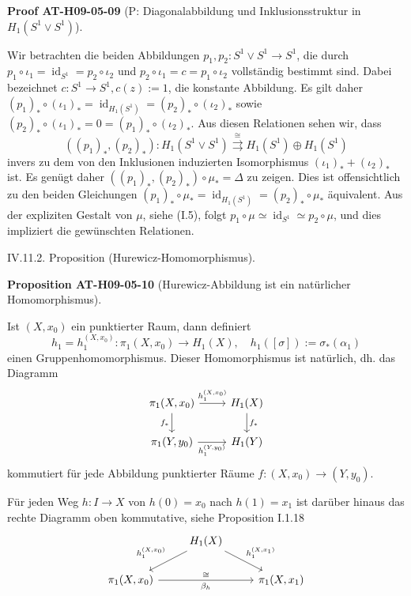 \documentclass[10pt, letterpaper]{article}
\newcommand{\CustomHeading}[3]{%
  \par\medskip\noindent%
  \textbf{#1 #2} \textnormal{(#3)}.\enskip%
}
\newenvironment{PROP}[2]{\begin{unitbox}\CustomHeading{Proposition}{#1}{#2}}{\end{unitbox}}
\newenvironment{PROOF}[2]{\begin{unitbox}\CustomHeading{Proof}{#1}{#2}}{\end{unitbox}}
\begin{document}
\begin{PROOF}{AT-H09-05-09}{P: Diagonalabbildung und Inklusionsstruktur in $H_1\left(S^1 \vee S^1\right)$}
Wir betrachten die beiden Abbildungen $p_1, p_2: S^1 \vee S^1 \rightarrow S^1$, die durch $p_1 \circ \iota_1=\operatorname{id}_{S^1}=p_2 \circ \iota_2$ und $p_2 \circ \iota_1=c=p_1 \circ \iota_2$ vollständig bestimmt sind. Dabei bezeichnet $c: S^1 \rightarrow S^1, c(z):=1$, die konstante Abbildung. Es gilt daher $\left(p_1\right)_* \circ\left(\iota_1\right)_*=\operatorname{id}_{H_1\left(S^1\right)}=\left(p_2\right)_* \circ\left(\iota_2\right)_*$ sowie $\left(p_2\right)_* \circ\left(\iota_1\right)_*=0=\left(p_1\right)_* \circ\left(\iota_2\right)_*$. Aus diesen Relationen sehen wir, dass
$$
\left(\left(p_1\right)_*,\left(p_2\right)_*\right): H_1\left(S^1 \vee S^1\right) \stackrel{\cong}{\rightrightarrows} H_1\left(S^1\right) \oplus H_1\left(S^1\right)
$$
invers zu dem von den Inklusionen induzierten Isomorphismus $\left(\iota_1\right)_*+\left(\iota_2\right)_*$ ist. Es genügt daher $\left(\left(p_1\right)_*,\left(p_2\right)_*\right) \circ \mu_*=\Delta$ zu zeigen. Dies ist offensichtlich zu den beiden Gleichungen $\left(p_1\right)_* \circ \mu_*=\operatorname{id}_{H_1\left(S^1\right)}=\left(p_2\right)_* \circ \mu_*$ äquivalent. Aus der expliziten Gestalt von $\mu$, siehe (I.5), folgt $p_1 \circ \mu \simeq \operatorname{id}_{S^1} \simeq p_2 \circ \mu$, und dies impliziert die gewünschten Relationen.
\end{PROOF}




IV.11.2. Proposition (Hurewicz-Homomorphismus). 


\begin{PROP}{AT-H09-05-10}{Hurewicz-Abbildung ist ein natürlicher Homomorphismus}
Ist $(X, x_0)$ ein punktierter Raum, dann definiert 
$$h_1=h_1^{\left(X, x_0\right)}: \pi_1\left(X, x_0\right) \rightarrow H_1(X), \quad h_1([\sigma]):=\sigma_*\left(\alpha_1\right)$$
einen Gruppenhomomorphismus. Dieser Homomorphismus ist natürlich, dh. das Diagramm
\[
\begin{tikzcd}
\pi_1(X, x_0) \arrow[r, "h_1^{(X,x_0)}"] \arrow[d, "f_*"'] & H_1(X) \arrow[d, "f_*"] \\
\pi_1(Y, y_0) \arrow[r, "h_1^{(Y,y_0)}"'] & H_1(Y)
\end{tikzcd}
\]
kommutiert für jede Abbildung punktierter Räume $f:\left(X, x_0\right) \rightarrow\left(Y, y_0\right)$. 

Für jeden Weg $h: I \rightarrow X$ von $h(0)=x_0$ nach $h(1)=x_1$ ist darüber hinaus das rechte Diagramm oben kommutative, siehe Proposition I.1.18
\[
\begin{tikzcd}
  & H_1(X) \arrow[dl, "h_1^{(X,x_0)}"'] \arrow[dr, "h_1^{(X,x_1)}"] \\
  \pi_1(X, x_0) \arrow[rr, "\beta_h"', "\cong"{above}] & & \pi_1(X, x_1)
\end{tikzcd}
\]
\end{PROP}
\end{document}
